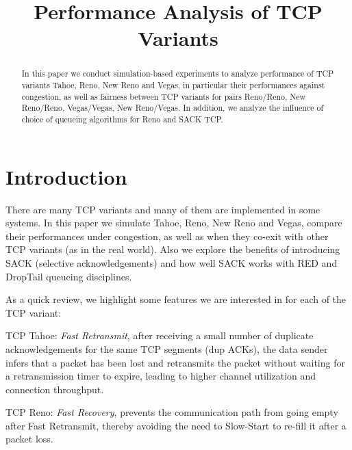 \documentclass[10pt, conference]{IEEEtran/IEEEtran}
\begin{document}
\title{Performance Analysis of TCP Variants}

\author{
\and
{}
}
\maketitle
\begin{abstract}
In this paper we conduct simulation-based experiments to analyze performance of  TCP variants Tahoe, Reno, New Reno and Vegas, in particular their performances against congestion, as well as fairness between TCP variants for pairs Reno/Reno, New Reno/Reno, Vegas/Vegas, New Reno/Vegas. In addition, we analyze the influence of choice of queueing algorithms for Reno and SACK TCP.
\end{abstract}
\section{Introduction}
There are many TCP variants and many of them are implemented in some systems. In this paper we simulate Tahoe, Reno, New Reno and Vegas, compare their performances under congestion, as well as when they co-exit with other TCP variants (as in the real world). Also we explore the benefits of introducing SACK (selective acknowledgements)  and how well SACK works with RED and DropTail queueing disciplines.

As a quick review, we highlight some features we are interested in for each of the TCP variant\cite{sim}:

TCP Tahoe: \textit{Fast Retransmit}, after receiving a small number of duplicate acknowledgements for the same TCP segments (dup ACKs), the data sender infers that a packet has been lost and retransmits the packet without waiting for a retransmission timer to expire, leading to higher channel utilization and connection throughput.

TCP Reno: \textit{Fast Recovery}, prevents the communication path from going empty after Fast Retransmit, thereby avoiding the need to Slow-Start to re-fill it after a packet loss.
\end{document}
